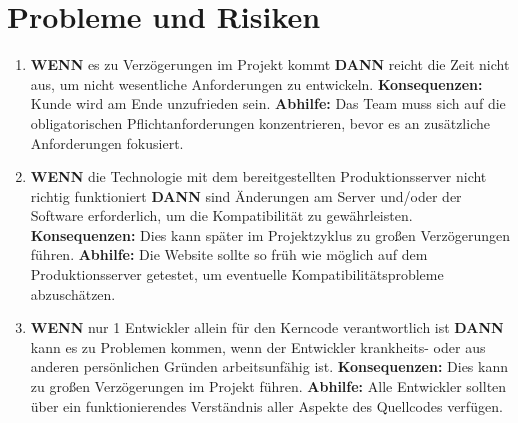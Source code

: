 \section{Probleme und Risiken}
\begin{enumerate}
	\item
    \textbf{WENN} es zu Verzögerungen im Projekt kommt \textbf{DANN} reicht die Zeit nicht aus, um nicht wesentliche Anforderungen zu entwickeln.
    \linebreak
    \linebreak
    \textbf{Konsequenzen:} Kunde wird am Ende unzufrieden sein.
    \linebreak
    \linebreak
    \textbf{Abhilfe:} Das Team muss sich auf die obligatorischen Pflichtanforderungen konzentrieren, bevor es an zusätzliche Anforderungen fokusiert.
    \linebreak

    \item
    \textbf{WENN} die Technologie mit dem bereitgestellten Produktionsserver nicht richtig funktioniert \textbf{DANN} sind Änderungen am Server und/oder der Software erforderlich, um die Kompatibilität zu gewährleisten.
    \linebreak
    \linebreak
    \textbf{Konsequenzen:} Dies kann später im Projektzyklus zu großen Verzögerungen führen.
    \linebreak
    \linebreak
    \textbf{Abhilfe:} Die Website sollte so früh wie möglich auf dem Produktionsserver getestet, um eventuelle Kompatibilitätsprobleme abzuschätzen.
    \linebreak
    
    \item
    \textbf{WENN} nur 1 Entwickler allein für den Kerncode verantwortlich ist \textbf{DANN} kann es zu Problemen kommen, wenn der Entwickler krankheits- oder aus anderen persönlichen Gründen arbeitsunfähig ist. 
    \linebreak
    \linebreak
    \textbf{Konsequenzen:}
    Dies kann zu großen Verzögerungen im Projekt führen.
    \linebreak
    \linebreak
    \textbf{Abhilfe:} Alle Entwickler sollten über ein funktionierendes Verständnis aller Aspekte des Quellcodes verfügen.
    \linebreak


\end{enumerate}
